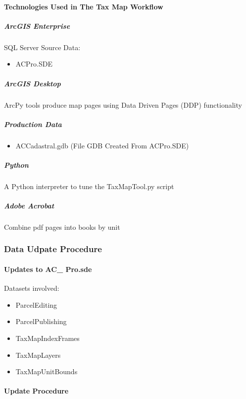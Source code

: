 \paragraph{Technologies Used in The Tax Map Workflow}
\begin{adjmulticols}{2}{\innerMar}{\outerMar}
\subparagraph{ArcGIS Enterprise}
SQL Server Source Data:
\begin{itemize}
\item ACPro.SDE
\end{itemize}
\subparagraph{ArcGIS Desktop}\noindent ArcPy tools produce map pages using Data Driven Pages (DDP) functionality
\subparagraph{Production Data}
\begin{itemize}
\item ACCadastral.gdb {\tiny (File GDB Created From ACPro.SDE)}
\end{itemize}
\subparagraph{Python}\noindent A Python interpreter to tune the TaxMapTool.py script  
  
  
\subparagraph{Adobe Acrobat}\noindent Combine pdf pages into books by unit
\end{adjmulticols}



\clearpage
\subsubsection{Data Udpate Procedure}
\paragraph{Updates to AC\_ Pro.sde}
Datasets involved:

\begin{itemize}
\item ParcelEditing
\item ParcelPublishing
\item TaxMapIndexFrames
\item TaxMapLayers
\item TaxMapUnitBounds
\end{itemize}
\paragraph{Update Procedure}   
   
